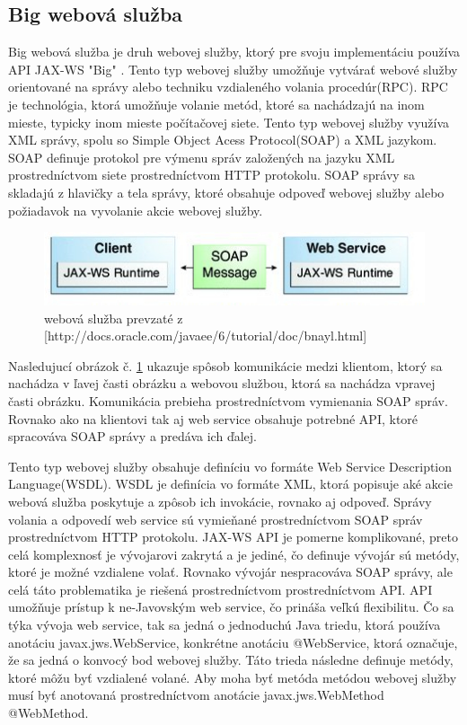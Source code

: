 \subsection{Big webová služba}\label{bigkap}
Big webová služba je druh webovej služby, ktorý pre svoju implementáciu používa API JAX-WS\cite{fitweb} "Big" . Tento typ webovej služby umožňuje vytvárať webové služby orientované na správy alebo techniku vzdialeného volania procedúr(RPC). RPC je technológia, ktorá umožňuje volanie metód, ktoré sa nachádzajú na inom mieste, typicky inom mieste počítačovej siete. Tento typ webovej služby využíva XML správy, spolu so Simple Object Acess Protocol(SOAP) a XML jazykom. SOAP definuje protokol pre výmenu správ založených na jazyku XML prostredníctvom siete prostredníctvom HTTP protokolu. SOAP správy sa skladajú z hlavičky a tela správy, ktoré obsahuje odpoveď webovej služby alebo požiadavok na vyvolanie akcie webovej služby.
\begin{figure}[htb]

\begin{center}

\includegraphics[scale=0.5]{webservice.jpg} 
\caption{ webová služba  prevzaté z [http://docs.oracle.com/javaee/6/tutorial/doc/bnayl.html] }
\label{com}

\end{center}

\end{figure}
Nasledujucí obrázok č. \ref{com} ukazuje spôsob komunikácie medzi klientom, ktorý sa nachádza v ľavej časti obrázku a webovou službou, ktorá sa nachádza vpravej časti obrázku. Komunikácia prebieha prostredníctvom vymienania SOAP správ. Rovnako ako na klientovi tak aj web service obsahuje potrebné API, ktoré spracováva SOAP správy a predáva ich ďalej.

 Tento typ webovej služby obsahuje definíciu vo formáte Web Service Description Language(WSDL). WSDL je definícia vo formáte XML, ktorá popisuje aké akcie webová služba poskytuje a zpôsob ich invokácie, rovnako  aj odpoveď. Správy volania a odpovedí web service sú vymieňané prostredníctvom SOAP správ prostredníctvom HTTP protokolu. JAX-WS API je pomerne komplikované, preto celá komplexnosť je vývojarovi zakrytá a je jediné, čo definuje vývojár sú metódy, ktoré je možné vzdialene volať. Rovnako vývojár nespracováva SOAP správy, ale celá táto problematika je riešená prostredníctvom prostredníctvom API. API umožňuje prístup k ne-Javovským web service, čo prináša veľkú flexibilitu. Čo sa týka vývoja web service, tak sa jedná o jednoduchú Java triedu, ktorá používa anotáciu javax.jws.WebService, konkrétne anotáciu @WebService, ktorá označuje, že sa jedná o konvocý bod webovej služby. Táto trieda následne definuje metódy, ktoré môžu byť vzdialené volané. Aby moha byť metóda metódou webovej služby musí byť anotovaná prostredníctvom anotácie  javax.jws.WebMethod @WebMethod.

